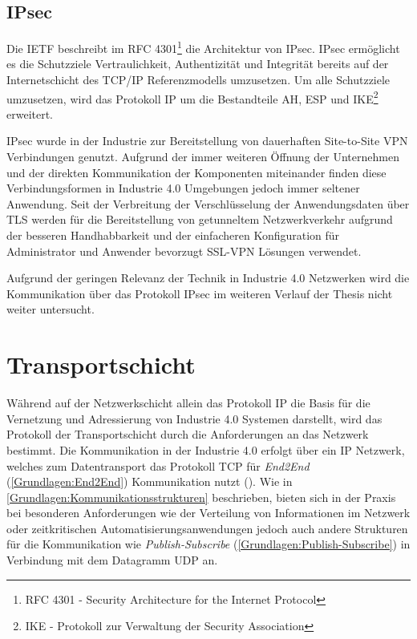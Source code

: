 \subsection{\ac{IPsec}}
Die \ac{IETF} beschreibt im \ac{RFC} 4301\footnote{RFC 4301 - Security Architecture for the Internet Protocol} die Architektur von \ac{IPsec}. \ac{IPsec} ermöglicht es die Schutzziele Vertraulichkeit, Authentizität und Integrität bereits auf der Internetschicht des \ac{TCP}/\ac{IP} Referenzmodells umzusetzen. Um alle Schutzziele umzusetzen, wird das Protokoll \ac{IP} um die Bestandteile \ac{AH}, \ac{ESP} und IKE\footnote{IKE - Protokoll zur Verwaltung der Security Association} erweitert.

\ac{IPsec} wurde in der Industrie zur Bereitstellung von dauerhaften Site-to-Site \ac{VPN} Verbindungen genutzt. Aufgrund der immer weiteren Öffnung der Unternehmen und der direkten Kommunikation der Komponenten miteinander finden diese Verbindungsformen in Industrie 4.0 Umgebungen jedoch immer seltener Anwendung. Seit der Verbreitung der Verschlüsselung der Anwendungsdaten über \ac{TLS} werden für die Bereitstellung von getunneltem Netzwerkverkehr aufgrund der besseren Handhabbarkeit und der einfacheren Konfiguration für Administrator und Anwender bevorzugt \ac{SSL}-\ac{VPN} Lösungen verwendet.

Aufgrund der geringen Relevanz der Technik in Industrie 4.0 Netzwerken wird die Kommunikation über das Protokoll \ac{IPsec} im weiteren Verlauf der Thesis nicht weiter untersucht.

\section{Transportschicht}
\label{Analyse:Transportschicht}
Während auf der Netzwerkschicht allein das Protokoll \ac{IP} die Basis für die Vernetzung und Adressierung von Industrie 4.0 Systemen darstellt, wird das Protokoll der Transportschicht durch die Anforderungen an das Netzwerk bestimmt. Die Kommunikation in der Industrie 4.0 erfolgt über ein \ac{IP} Netzwerk, welches zum Datentransport das Protokoll \ac{TCP} für \textit{End2End} (\autoref{Grundlagen:End2End}) Kommunikation nutzt (\cite{sichKom2017}). Wie in \autoref{Grundlagen:Kommunikationsstrukturen} beschrieben, bieten sich in der Praxis bei besonderen Anforderungen wie der Verteilung von Informationen im Netzwerk oder zeitkritischen Automatisierungsanwendungen jedoch auch andere Strukturen für die Kommunikation wie \textit{Publish-Subscribe} (\autoref{Grundlagen:Publish-Subscribe}) in Verbindung mit dem Datagramm \ac{UDP} an. 

